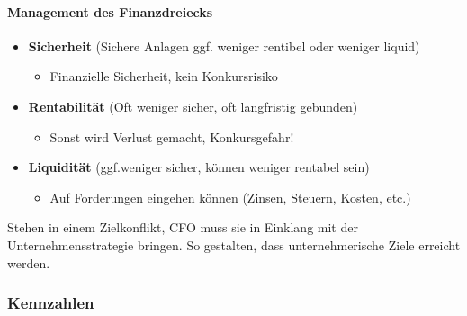 \documentclass[../ZF_Wing.tex]{subfiles}
\begin{document}
\paragraph{Management des Finanzdreiecks}

\begin{itemize}
	\item \colorbox{orange!30} {\textbf{Sicherheit}} (Sichere Anlagen ggf. weniger rentibel oder weniger liquid)
	\begin{itemize}
		\item Finanzielle Sicherheit, kein Konkursrisiko
	\end{itemize}
	\item \colorbox{orange!30} {\textbf{Rentabilität}} (Oft weniger sicher, oft langfristig gebunden)
	\begin{itemize}
		\item Sonst wird Verlust gemacht, Konkursgefahr!
	\end{itemize}
	\item \colorbox{orange!30} {\textbf{Liquidität}} (ggf.weniger sicher, können weniger rentabel sein)
	\begin{itemize}
		\item Auf Forderungen eingehen können (Zinsen, Steuern, Kosten, etc.)
	\end{itemize}
\end{itemize}

Stehen in einem Zielkonflikt, CFO muss sie in Einklang mit der Unternehmensstrategie bringen. So gestalten, dass unternehmerische Ziele erreicht werden.

\subsubsection{Kennzahlen}
\end{document}
